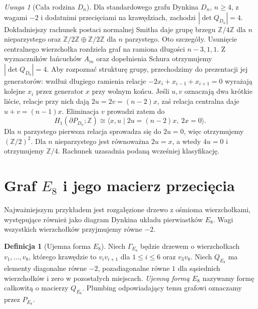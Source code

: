 \documentclass[11pt,a4paper]{report}
\numberwithin{equation}{section}
\theoremstyle{plain}
\theoremstyle{definition}
\newtheorem{definicja}[twierdzenie]{Definicja}
\theoremstyle{remark}
\newtheorem{uwaga}[twierdzenie]{Uwaga}
\begin{document}
\begin{uwaga}[Cała rodzina $D_n$]
Dla standardowego grafu Dynkina $D_n$, $n\ge4$, z wagami
$-2$ i dodatnimi przecięciami na krawędziach, zachodzi
$|\det Q_{D_n}|=4$. Dokładniejszy rachunek postaci normalnej
Smitha daje grupę brzegu $\mathbb Z/4\mathbb Z$ dla $n$
nieparzystego oraz
$\mathbb Z/2\mathbb Z\oplus\mathbb Z/2\mathbb Z$ dla $n$
parzystego. Oto szczegóły. Usunięcie centralnego wierzchołka rozdziela
graf na ramiona długości $n-3,1,1$. Z wyznaczników
łańcuchów $A_m$ oraz dopełnienia Schura otrzymujemy
$|\det Q_{D_n}|=4$. Aby rozpoznać strukturę grupy,
przechodzimy do prezentacji jej generatorów: wzdłuż długiego
ramienia relacje $-2x_i+x_{i-1}+x_{i+1}=0$ wyrażają
kolejne $x_i$ przez generator $x$ przy wolnym końcu.
Jeśli $u,v$ oznaczają dwa krótkie liście, relacje przy
nich dają $2u=2v=(n-2)x$, zaś relacja centralna daje
$u+v=(n-1)x$. Eliminacja $v$ prowadzi zatem do
\[
H_1(\partial P_{D_n};\mathbb Z)
\cong \langle x,u\mid 2u=(n-2)x,\ 2x=0\rangle.
\]
Dla $n$ parzystego pierwsza relacja sprowadza się do
$2u=0$, więc otrzymujemy $(\mathbb Z/2)^2$.
Dla $n$ nieparzystego jest równoważna $2u=x$,
a wtedy $4u=0$ i otrzymujemy $\mathbb Z/4$.
Rachunek uzasadnia podaną wcześniej klasyfikację.
\end{uwaga}

\section{Graf \texorpdfstring{$E_8$}{E8} i jego macierz przecięcia}
\label{sec:tg-plumbing-E8}

Najważniejszym przykładem jest rozgałęzione drzewo z ośmioma
wierzchołkami, występujące również jako diagram Dynkina
układu pierwiastków $E_8$. Wagi wszystkich wierzchołków
przyjmujemy równe $-2$.

\begin{definicja}[Ujemna forma $E_8$]
Niech $\Gamma_{E_8}$ będzie drzewem o wierzchołkach
$v_1,\ldots,v_8$, którego krawędzie to
$v_iv_{i+1}$ dla $1\le i\le6$ oraz $v_3v_8$.
Niech $Q_{E_8}$ ma elementy diagonalne równe $-2$,
pozadiagonalne równe $1$ dla sąsiednich wierzchołków
i zero w pozostałych miejscach. \emph{Ujemną formą
$E_8$} nazywamy formę całkowitą o macierzy $Q_{E_8}$.
Plumbing odpowiadający temu grafowi oznaczamy
przez $P_{E_8}$.
\end{definicja}

\begin{center}
\end{center}
\end{document}
